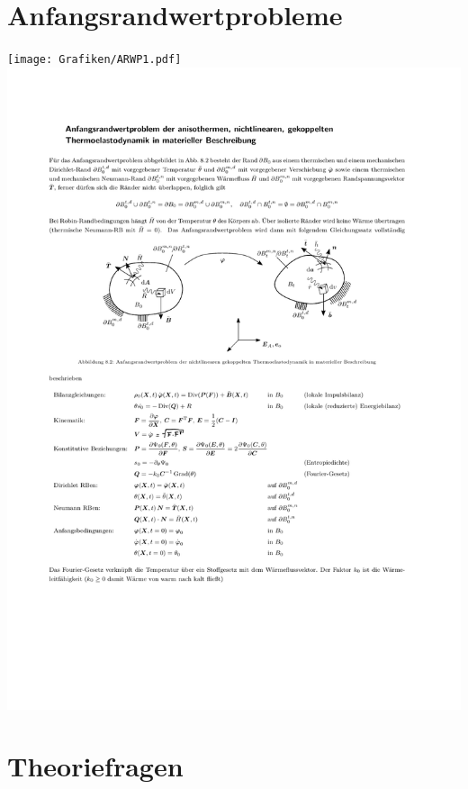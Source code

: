 \documentclass[fleqn,twoside]{article}
\begin{document}
\section{Anfangsrandwertprobleme}
\texttt{[image: Grafiken/ARWP1.pdf]}
\newpage
\includegraphics[page=1]{Grafiken/ARWP2.pdf}
\newpage

\section{Theoriefragen}
\end{document}
